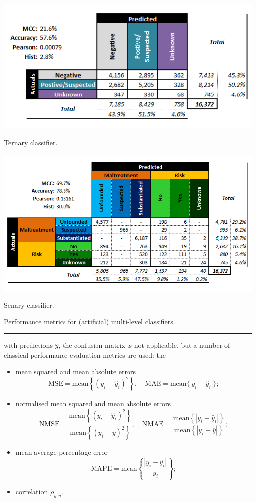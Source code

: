 \begin{table}[t]
  \centering
  \begin{subtable}[c]{0.4\textwidth}
    \includegraphics[width=1\textwidth]{images/DSML/confusion_bonus_50run_noinfo_rep}
  \caption{\small Ternary classifier.}
  \end{subtable}
    \begin{subtable}[c]{0.45\textwidth}
    \includegraphics[width=1\textwidth]{images/DSML/confusion_classification_50run_info}
  \caption{\small Senary classifier.}
  \end{subtable}
  \caption{\small Performance metrics for (artificial) multi-level classifiers.}\hrule
  \label{tab:ternary}
\end{table}
 with predictions $\hat{y}$, the confusion matrix is not applicable, but a number of classical performance evaluation metrics are used: the 
\begin{itemize}[noitemsep]
\item mean squared and mean absolute errors $$\textrm{MSE}=\textrm{mean}\left\{(y_i-\hat{y}_i)^2\right\}, \quad \textrm{MAE}=\textrm{mean}\{|y_i-\hat{y}_i|\};$$ 
\item normalised mean squared and mean absolute errors $$\textrm{NMSE}=\frac{\textrm{mean}\left\{(y_i-\hat{y}_i)^2\right\}}{\textrm{mean}\left\{(y_i-\overline{y})^2\right\}},\quad \textrm{NMAE}=\frac{\textrm{mean}\left\{|y_i-\hat{y}_i|\right\}}{\textrm{mean}\left\{|y_i-\overline{y}|\right\}};$$
\item mean average percentage error $$\textrm{MAPE}=\textrm{mean}\left\{\frac{|y_i-\hat{y}_i|}{y_i}\right\};$$
\item correlation $\rho_{y,\hat{y}}$.
\end{itemize}
